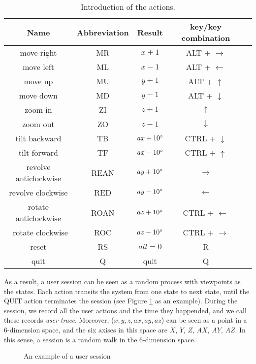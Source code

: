\begin{table}
    \centering
    \begin{tabular}{|c|c|c|c|c|}
        \hline
        Name & Abbreviation & Result & key/key combination \\
        \hline
        move right & MR     & $x + 1$  & ALT + $\rightarrow$\\
        move left  & ML     & $x - 1$  & ALT + $\leftarrow$\\
        move up    & MU     & $y + 1$  & ALT + $\uparrow$\\
        move down  & MD     & $y - 1$  & ALT + $\downarrow$\\
        zoom in    & ZI     & $z + 1$  & $\uparrow$\\
        zoom out   & ZO     & $z - 1$  & $\downarrow$\\
        tilt backward & TB  & $ax + 10^\circ$ & CTRL + $\downarrow$\\
        tilt forward & TF   & $ax - 10^\circ$ & CTRL + $\uparrow$\\
        revolve anticlockwise & REAN & $ay + 10^\circ$ & $\rightarrow$\\
        revolve clockwise & RED & $ay - 10^\circ$ & $\leftarrow$\\
        rotate  anticlockwise & ROAN & $az + 10^\circ$ & CTRL + $\leftarrow$\\\
        rotate  clockwise & ROC &  $az - 10^\circ$ & CTRL + $\rightarrow$\\
        reset      & RS     & $all = 0$  & R \\
        quit       & Q      & quit     & Q \\
        \hline
    \end{tabular}
    \caption{Introduction of the actions.}\label{t:user:action}
\end{table}


As a result, a user session can be seen as a random process 
with viewpoints as the states. Each action transits
the system from one state to next state, until the QUIT
action terminates the session (see Figure \ref{f:user:transition} as an example). 
During the session, we record
all the user actions and the time they happended, and we call these 
records \textit{user trace}.
Moreover, ($x, y, z, ax, ay, az$) can be seen as a point in a 6-dimension space, and
the six axises in this space are $X$, $Y$, $Z$, $AX$, $AY$, $AZ$. 
In this sense, a session is a random walk in the 6-dimension space.
\begin{figure}
    \centering
    \caption{An example of a user session}
    \label{f:user:transition}
\end{figure}


